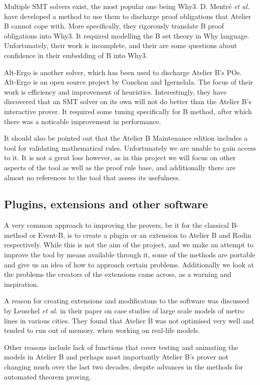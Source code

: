 \documentclass[11pt,journal]{IEEEtran}
\begin{document}
	Multiple SMT solvers exist, the most popular one being Why3. D. Mentr\'{e} \emph{et al.} have developed a method to use them to discharge proof obligations that Atelier B cannot cope with. More specifically, they rigorously translate B proof obligations into Why3. It required modelling the B set theory in Why language. Unfortunately, their work is incomplete, and their are some questions about confidence in their embedding of B into Why3.
	
	Alt-Ergo is another solver, which has been used to discharge Atelier B's POs.\cite{Alt-Ergo} Alt-Ergo is an open source project by Conchon and Igernelala. The focus of their work is efficiency and improvement of heuristics. Interestingly, they have discovered that an SMT solver on its own will not do better than the Atelier B's interactive prover. It required some tuning specifically for B method, after which there was a noticable improvement in performance.
	
	It should also be pointed out that the Atelier B Maintenance edition includes a tool for validating mathematical rules. Unfortunately we are unable to gain access to it. It is not a great loss however, as in this project we will focus on other aspects of the tool as well as the proof rule base, and additionally there are almost no references to the tool that assess its usefulness.
	
	\subsection{Plugins, extensions and other software}
	
	A very common approach to improving the provers, be it for the classical B-method or Event-B, is to create a plugin or an extension to Atelier B and Rodin respectively. While this is not the aim of the project, and we make an attempt to improve the tool by means available through it, some of the methods are portable and give us an idea of how to approach certain problems. Additionally we look at the problems the creators of the extensions came across, as a warning and inspiration.
	
	A reason for creating extensions and modificatons to the software was discussed by Leuschel \emph{et al.} in their paper on case studies of large scale models of metro lines in various cities\cite{San Juan metro}. They found that Atelier B was not optimised very well and tended to run out of memory, when working on real-life models.
	
	Other reasons include lack of functions that cover testing and animating the models in Atelier B and perhaps most importantly Atelier B's prover not changing much over the last two decades, despite advances in the methods for automated theorem proving.
	
\end{document}
